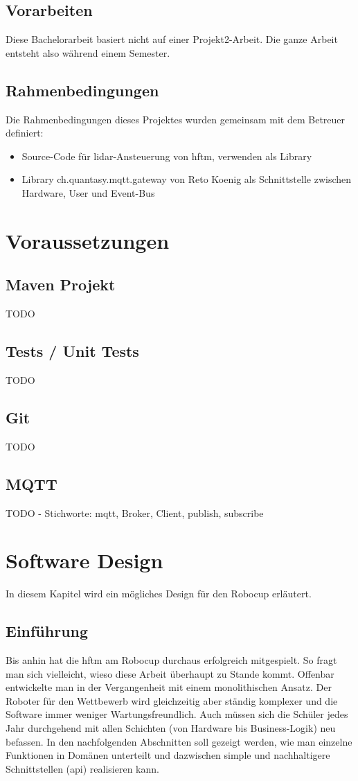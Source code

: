 \documentclass[11pt,english,german]{report}
\begin{document}
\section{Vorarbeiten}
Diese Bachelorarbeit basiert nicht auf einer Projekt2-Arbeit. Die ganze Arbeit entsteht also während einem Semester.

\section{Rahmenbedingungen}
Die Rahmenbedingungen dieses Projektes wurden gemeinsam mit dem Betreuer definiert:
\begin{itemize}
\item Source-Code für \acrshort{lidar}-Ansteuerung von \acrshort{hftm}, verwenden als Library
\item Library ch.quantasy.mqtt.gateway\cite{ch.quantasy.mqtt.gateway} von Reto Koenig als Schnittstelle zwischen Hardware, User und Event-Bus
\end{itemize}


\chapter{Voraussetzungen}
\section{Maven Projekt}
TODO
\section{Tests / Unit Tests}
TODO
\section{Git}
TODO
\section{MQTT}
\label{sec:mqtt}
TODO - Stichworte: \acrshort{mqtt}, Broker, Client, publish, subscribe

\chapter{Software Design}
In diesem Kapitel wird ein mögliches Design für den Robocup erläutert.
\section{Einführung}
Bis anhin hat die \acrshort{hftm} am Robocup durchaus erfolgreich mitgespielt. So fragt man sich vielleicht, wieso diese Arbeit überhaupt zu Stande kommt. Offenbar entwickelte man in der Vergangenheit mit einem monolithischen Ansatz. Der Roboter für den Wettbewerb wird gleichzeitig aber ständig komplexer und die Software immer weniger Wartungsfreundlich. Auch müssen sich die Schüler jedes Jahr durchgehend mit allen Schichten (von Hardware bis Business-Logik) neu befassen. In den nachfolgenden Abschnitten soll gezeigt werden, wie man einzelne Funktionen in Domänen unterteilt und dazwischen simple und nachhaltigere Schnittstellen (\acrshort{api}) realisieren kann.
\end{document}
